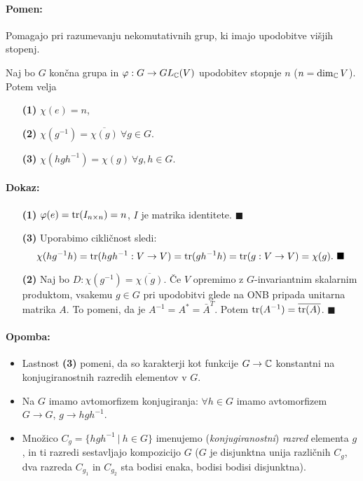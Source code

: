 \paragraph{Pomen:} Pomagajo pri razumevanju nekomutativnih grup, ki imajo upodobitve vi\v sjih stopenj.

\begin{trditev}
	Naj bo $G$ kon\v cna grupa in $\varphi : G \to GL_{\mathbb{C}}(V)$ upodobitev stopnje $n$ ($n = \dim_{\mathbb{C}} V$). Potem velja
	\begin{itemize}
		\item[{\bf(1)}]{$\chi(e) = n$,}
		\item[{\bf(2)}]{$\chi(g^{-1}) = \overline{\chi(g)}\ \forall g \in G$.}
		\item[{\bf(3)}]{$\chi(hgh^{-1}) = \chi (g)\ \forall g,h \in G$.}
	\end{itemize}
\end{trditev}

\paragraph{Dokaz:}
\begin{itemize}
	\item[{\bf(1)}]{$\varphi(e) = \operatorname{tr}(I_{n\times n}) = n$, $I$ je matrika identitete. $\blacksquare$}
	\item[{\bf(3)}]{Uporabimo cikli\v cnost sledi:
		\[
			\chi(hg^{-1}h) = \tr(hgh^{-1} : V \to V) = \tr (gh^{-1}h) = \tr(g : V \to V) = \chi(g).\ \blacksquare
		\]}
	\item[{\bf(2)}]{Naj bo $D : \chi(g^{-1}) = \overline{\chi(g)}$. \v Ce $V$ opremimo z $G$-invariantnim skalarnim produktom,
		vsakemu $g \in G$ pri upodobitvi glede na ONB pripada unitarna matrika $A$. To pomeni, da je $A^{-1} = A^* =
		\bar{A}^T$. Potem $\operatorname{tr}(A^{-1}) = \overline{\operatorname{tr}(A)}$. $\blacksquare$}
\end{itemize}

\paragraph{Opomba:}
\begin{itemize}
	\item{Lastnost {\bf(3)} pomeni, da so karakterji kot funkcije $G \to \mathbb{C}$ konstantni na konjugiranostnih razredih elementov v
		$G$.}
	\item{Na $G$ imamo avtomorfizem konjugiranja: $\forall h \in G$ imamo avtomorfizem $G \to G$, $g \to hgh^{-1}$.}
	\item{Mno\v zico $C_g = \{hgh^{-1}\ |\ h \in G\}$ imenujemo (\emph{konjugiranostni}) \emph{razred} elementa $g$, in
		ti razredi sestavljajo kompozicijo $G$ ($G$ je disjunktna unija razli\v cnih $C_g$, dva razreda $C_{g_1}$ in
		$C_{g_2}$ sta bodisi enaka, bodisi bodisi disjunktna).}
\end{itemize}

